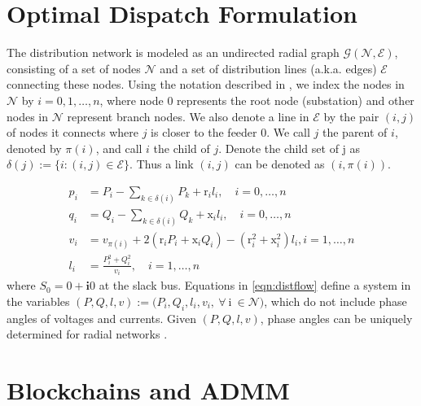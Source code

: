 \section{Optimal Dispatch Formulation}
\label{sec:formulation}

The distribution network is modeled as an undirected radial graph $\mathcal{G}(\mathcal{N},\mathcal{E})$, consisting of a set of nodes $\mathcal{N}$ and a set of distribution lines (a.k.a. edges) $\mathcal{E}$ connecting these nodes. Using the notation described in \cite{Li2015c}, we index the nodes in $\mathcal{N}$ by $i = 0, 1, \dots, n$, where node $0$ represents the root node (substation) and other nodes in $\mathcal{N}$ represent branch nodes. We also denote a line in $\mathcal{E}$ by the pair $(i, j)$ of nodes it connects where $j$ is closer to the feeder $0$. We call $j$ the parent of $i$, denoted by $\pi(i)$, and call $i$ the child of $j$. Denote the child set of j as $\delta(j):=\{i:(i,j)\in \mathcal{E}\}$. Thus a link $(i, j)$ can be denoted as $(i, \pi(i))$. 

\begin{subequations}\label{eqn:distflow}
\begin{align}
p_i &= P_i -\sum_{k\in\delta(i)}P_{k} + \text{r}_{i}l_{i}, \quad i=0,\dots,n \label{eq:pf1}\\
q_i &= Q_i -\sum_{k\in\delta(i)}Q_{k} + \text{x}_{i}l_{i}, \quad i=0,\dots,n \label{eq:pf2}\\
v_i &= v_{\pi(i)}+ 2(\text{r}_{i}P_{i} +\text{x}_{i}Q_{i}) - (\text{r}_{i}^2 + \text{x}_{i}^2)l_{i}, i=1,\dots,n  \label{eq:pf3}\\
l_{i} &= \frac{P_{i}^2 + Q_{i}^2}{v_i}, \quad i=1,\dots,n  \label{eq:noncvxbranchflow}
\end{align}
\end{subequations}
where $S_0=0+\mathbf{i}0$ at the slack bus. Equations in \eqref{eqn:distflow} define a system in the variables $(P,Q,l,v):=(P_i,Q_i,l_i,v_i, \ \forall \ $i$ \ \in \mathcal{N})$, which do not include phase angles of voltages and currents. Given $(P,Q,l,v)$, phase angles can be uniquely determined for radial networks \cite{Farivar2013}.


\section{Blockchains and ADMM}
\label{sec:blockchainadmm}

\lipsum[3]


